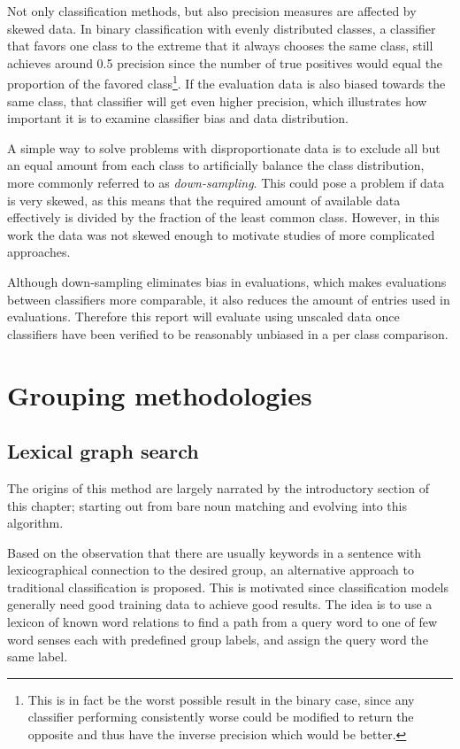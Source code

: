 \documentclass[a4paper,11pt]{kth-mag}
\begin{document}
Not only classification methods, but also precision measures are affected by skewed data. In binary
classification with evenly distributed classes, a classifier that favors one class to the extreme that it
always chooses the same class, still achieves around 0.5 precision since the number of true positives
would equal the proportion of the favored class\footnote{This is in fact be the worst possible result
in the binary case, since any classifier performing consistently worse could be modified to return the
opposite and thus have the inverse precision which would be better.}.
If the evaluation data is also biased towards the same class, that classifier will get even
higher precision, which illustrates how important it is to examine classifier
bias and data distribution.

A simple way to solve problems with disproportionate data is to exclude all but an equal amount
from each class to artificially balance the class distribution,
more commonly referred to as \emph{down-sampling}\cite{provost2000machine}.
This could pose a problem if data is very skewed, as this means that the required
amount of available data effectively is divided by the fraction of the least common class.
However, in this work the data was not skewed enough to motivate studies of more
complicated approaches.

Although down-sampling eliminates bias in evaluations, which makes evaluations between
classifiers more comparable, it also reduces the amount of entries used in evaluations.
Therefore this report will evaluate using unscaled data once classifiers have been
verified to be reasonably unbiased in a per class comparison.


\clearpage
\section{Grouping methodologies}
\subsection{Lexical graph search}
The origins of this method are largely narrated by the introductory section of this chapter;
starting out from bare noun matching and evolving into this algorithm.

Based on the observation that there are usually keywords in a sentence with lexicographical
connection to the desired group, an alternative approach to traditional classification is proposed.
This is motivated since classification models generally need good training data to achieve good results.
The idea is to use a lexicon of known word relations to find a path from a query word to one of
few word senses each with predefined group labels, and assign the query word the same label.
\end{document}

